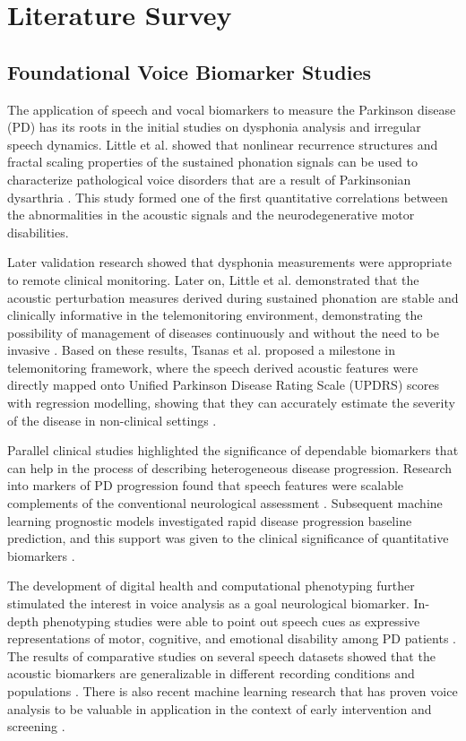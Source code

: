 \documentclass{customIEEEsingle}
\begin{document}
	\section{Literature Survey}\label{sec:literature}
	
	\subsection{Foundational Voice Biomarker Studies}
	
	The application of speech and vocal biomarkers to measure the Parkinson disease (PD) has its roots in the initial studies on dysphonia analysis and irregular speech dynamics. Little et al. showed that nonlinear recurrence structures and fractal scaling properties of the sustained phonation signals can be used to characterize pathological voice disorders that are a result of Parkinsonian dysarthria \cite{little-2007}. This study formed one of the first quantitative correlations between the abnormalities in the acoustic signals and the neurodegenerative motor disabilities.
	
	Later validation research showed that dysphonia measurements were appropriate to remote clinical monitoring. Later on, Little et al. demonstrated that the acoustic perturbation measures derived during sustained phonation are stable and clinically informative in the telemonitoring environment, demonstrating the possibility of management of diseases continuously and without the need to be invasive \cite{little-2008}. Based on these results, Tsanas et al. proposed a milestone in telemonitoring framework, where the speech derived acoustic features were directly mapped onto Unified Parkinson Disease Rating Scale (UPDRS) scores with regression modelling, showing that they can accurately estimate the severity of the disease in non-clinical settings \cite{tsanas-2009}.
	
	Parallel clinical studies highlighted the significance of dependable biomarkers that can help in the process of describing heterogeneous disease progression. Research into markers of PD progression found that speech features were scalable complements of the conventional neurological assessment \cite{maetzler-2009}. Subsequent machine learning prognostic models investigated rapid disease progression baseline prediction, and this support was given to the clinical significance of quantitative biomarkers \cite{tsiouris-2017}.
	
	The development of digital health and computational phenotyping further stimulated the interest in voice analysis as a goal neurological biomarker. In-depth phenotyping studies were able to point out speech cues as expressive representations of motor, cognitive, and emotional disability among PD patients \cite{tracy-2019}. The results of comparative studies on several speech datasets showed that the acoustic biomarkers are generalizable in different recording conditions and populations \cite{neto-2024}. There is also recent machine learning research that has proven voice analysis to be valuable in application in the context of early intervention and screening \cite{swain-2024}.
	
\end{document}

